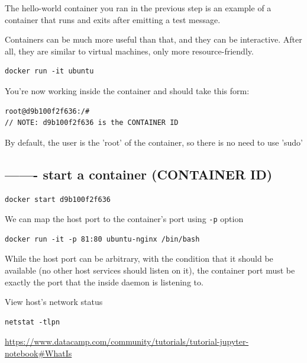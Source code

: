 The hello-world container you ran in the previous step is an example of a
container that runs and exits after emitting a test message.

Containers can be much more useful than that, and they can be interactive. After
all, they are similar to virtual machines, only more resource-friendly.

\begin{verbatim}
docker run -it ubuntu
\end{verbatim}
 
You're now working inside the container and should take this form:
\begin{verbatim}
root@d9b100f2f636:/#
// NOTE: d9b100f2f636 is the CONTAINER ID
\end{verbatim} 

By default, the user is the 'root' of the container, so there is no need to use 'sudo'

\subsection{------- start a container (CONTAINER ID)}

\begin{verbatim}
docker start d9b100f2f636
\end{verbatim}

We can map the host port to the container's port using \verb!-p! option
\begin{verbatim}
docker run -it -p 81:80 ubuntu-nginx /bin/bash
\end{verbatim}

While the host port can be arbitrary, with the condition that it should be
available (no other host services should listen on it), the container port must
be exactly the port that the inside daemon is listening to.

View host's network status
\begin{verbatim}
netstat -tlpn 
\end{verbatim}


\url{https://www.datacamp.com/community/tutorials/tutorial-jupyter-notebook#WhatIs}



